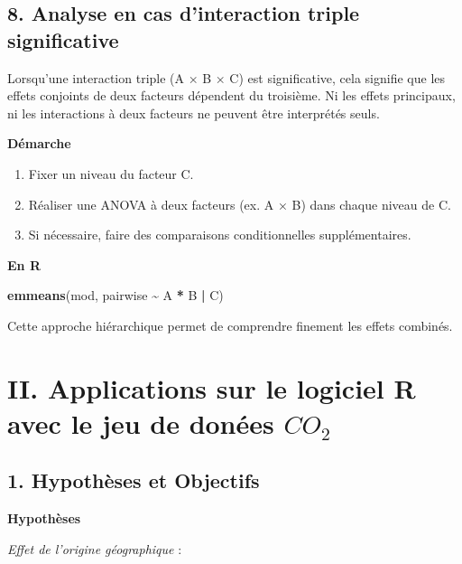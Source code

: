 \documentclass[
]{article}
\newenvironment{Shaded}{\begin{snugshade}}{\end{snugshade}}
\newcommand{\FunctionTok}[1]{\textcolor[rgb]{0.13,0.29,0.53}{\textbf{#1}}}
\newcommand{\NormalTok}[1]{#1}
\newcommand{\SpecialCharTok}[1]{\textcolor[rgb]{0.81,0.36,0.00}{\textbf{#1}}}
\providecommand{\tightlist}{%
  \setlength{\itemsep}{0pt}\setlength{\parskip}{0pt}}
\begin{document}
\subsection{8. Analyse en cas d'interaction triple
significative}\label{analyse-en-cas-dinteraction-triple-significative}

Lorsqu'une interaction triple (A × B × C) est significative, cela
signifie que les effets conjoints de deux facteurs dépendent du
troisième. Ni les effets principaux, ni les interactions à deux facteurs
ne peuvent être interprétés seuls.

\textbf{Démarche}

\begin{enumerate}
\def\labelenumi{\arabic{enumi}.}
\tightlist
\item
  Fixer un niveau du facteur C.
\item
  Réaliser une ANOVA à deux facteurs (ex. A × B) dans chaque niveau de
  C.
\item
  Si nécessaire, faire des comparaisons conditionnelles supplémentaires.
\end{enumerate}

\textbf{En R}

\begin{Shaded}
\begin{Highlighting}[]
\FunctionTok{emmeans}\NormalTok{(mod, pairwise }\SpecialCharTok{\textasciitilde{}}\NormalTok{ A }\SpecialCharTok{*}\NormalTok{ B }\SpecialCharTok{|}\NormalTok{ C)}
\end{Highlighting}
\end{Shaded}

Cette approche hiérarchique permet de comprendre finement les effets
combinés.

\section{\texorpdfstring{II. Applications sur le logiciel R avec le jeu
de donées
\(CO_2\)}{II. Applications sur le logiciel R avec le jeu de donées CO\_2}}\label{ii.-applications-sur-le-logiciel-r-avec-le-jeu-de-donuxe9es-co_2}

\subsection{1. Hypothèses et
Objectifs}\label{hypothuxe8ses-et-objectifs}

\textbf{Hypothèses}

\emph{Effet de l'origine géographique} :
\end{document}
